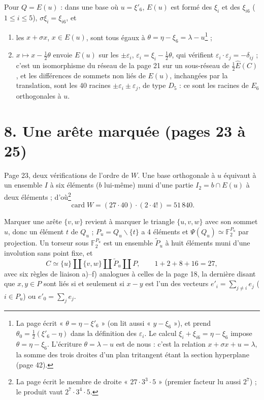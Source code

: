 \documentclass[11pt,a4paper]{article}
\begin{document}
Pour $Q = E(u)$ : dans une base où $u = \xi'_6$, $E(u)$ est formé des
$\xi_i$ et des $\xi_{i6}$ ($1 \leq i \leq 5$), $\sigma \xi_i = \xi_{i6}$, et

\begin{enumerate}
\item[a)] les $x + \sigma x$, $x \in E(u)$, sont tous égaux à $\theta = \eta -
  \xi_6 = \lambda - u$\footnote{La page écrit « $\theta = \eta - \xi'_6$ » (on
  lit aussi « $y - \xi_6$ »), et prend $\theta_0 = \tfrac12(\xi'_6 - \eta)$
  dans la définition des $\varepsilon_i$. Le calcul $\xi_i + \xi_{i6} = \eta -
  \xi_6$ impose $\theta = \eta - \xi_6$. L'écriture $\theta = \lambda - u$ est
  de nous : c'est la relation $x + \sigma x + u = \lambda$, la somme des trois
  droites d'un plan tritangent étant la section hyperplane (page 42).} ;
\item[b)] $x \mapsto x - \tfrac12 \theta$ envoie $E(u)$ sur les $\pm
  \varepsilon_i$, $\varepsilon_i = \xi_i - \tfrac12\theta$, qui vérifient
  $\varepsilon_i \cdot \varepsilon_j = -\delta_{ij}$ ; c'est un isomorphisme du
  réseau de la page 21 sur un sous-réseau de $\tfrac12 \widehat E(C)$, et les
  différences de sommets non liés de $E(u)$, inchangées par la translation,
  sont les 40 racines $\pm\varepsilon_i \pm \varepsilon_j$, de type $D_5$ :
  ce sont les racines de $E_6$ orthogonales à $u$.
\end{enumerate}

\section*{8. Une arête marquée (pages 23 à 25)}

Page 23, deux vérifications de l'ordre de $W$. Une base orthogonale à $u$
équivaut à un ensemble $I$ à six éléments ($b$ lui-même) muni d'une partie
$I_2 = b \cap E(u)$ à deux éléments ; d'où\footnote{La page écrit le membre
de droite « $27 \cdot 3^3 \cdot 5$ » (premier facteur lu aussi $2^7$) ; le
produit vaut $2^7 \cdot 3^4 \cdot 5$.}
\[
\operatorname{card} W = (27 \cdot 40) \cdot (2 \cdot 4!) = 51\,840 .
\]

Marquer une arête $\lbrace v, w\rbrace$ revient à marquer le triangle $\lbrace
u, v, w\rbrace$ avec son sommet $u$, donc un élément $t$ de $Q_u$ ; $P_u = Q_u
\smallsetminus \lbrace t\rbrace$ a 4 éléments et $\Psi(Q_u) \simeq
\mathbb{F}_2^{P_u}$ par projection. Un torseur sous
$\mathbb{F}_2^{P_u}$ est un ensemble $\widetilde P_u$ à huit éléments muni d'une
involution sans point fixe, et
\[
C \simeq \lbrace u\rbrace \amalg \lbrace v, w\rbrace \amalg \widetilde P_u
\amalg P , \qquad 1 + 2 + 8 + 16 = 27,
\]
avec six règles de liaison a)--f) analogues à celles de la page 18, la
dernière disant que $x, y \in P$ sont liés si et seulement si $x - y$ est l'un
des vecteurs $e'_i = \sum_{j \neq i} e_j$ ($i \in P_u$) ou $e'_0 = \sum_j e_j$.
\end{document}
